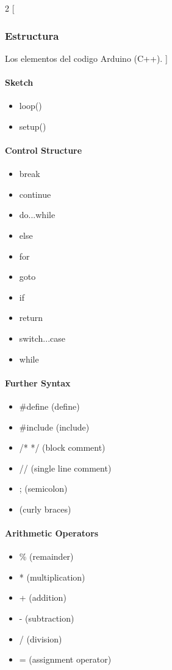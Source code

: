 \documentclass[../informe_krapp.tex]{subfiles}
\begin{document}
\begin{multicols}{2}
	[
		\subsubsection{Estructura}
		Los elementos del codigo Arduino (C++).
	]
	\paragraph{Sketch}
	\begin{itemize}
		\item loop()
		\item setup()
	\end{itemize}

	\paragraph{Control Structure}
	\begin{itemize}
		\item break
		\item continue
		\item do...while
		\item else
		\item for
		\item goto
		\item if
		\item return
		\item switch...case
		\item while
	\end{itemize}

	\paragraph{Further Syntax}
	\begin{itemize}
		\item \#define (define)
		\item \#include (include)
		\item /* */ (block comment)
		\item // (single line comment)
		\item ; (semicolon)
		\item {} (curly braces)
	\end{itemize}

	\paragraph{Arithmetic Operators}
	\begin{itemize}
		\item \% (remainder)
		\item * (multiplication)
		\item + (addition)
		\item - (subtraction)
		\item / (division)
		\item = (assignment operator)
	\end{itemize}


\end{multicols}
\end{document}
